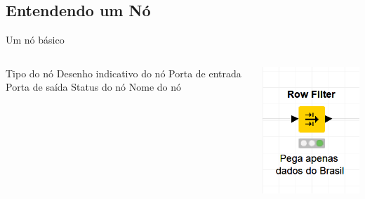 \documentclass{beamer}
\begin{document}
\subsection{Entendendo um Nó}
\begin{frame}{Um nó básico}
    \begin{columns}
        \begin{column}{0.5\linewidth}
            \begin{outline}
                \1 Tipo do nó
                \1 Desenho indicativo do nó
                \1 Porta de entrada
                \1 Porta de saída
                \1 Status do nó
                \1 Nome do nó
            \end{outline}
        \end{column}
        \begin{column}{0.5\linewidth}
            \includegraphics[width=0.8\linewidth]{Images/UmNo.png}
        \end{column}
    \end{columns}
\end{frame} 
\end{document}
